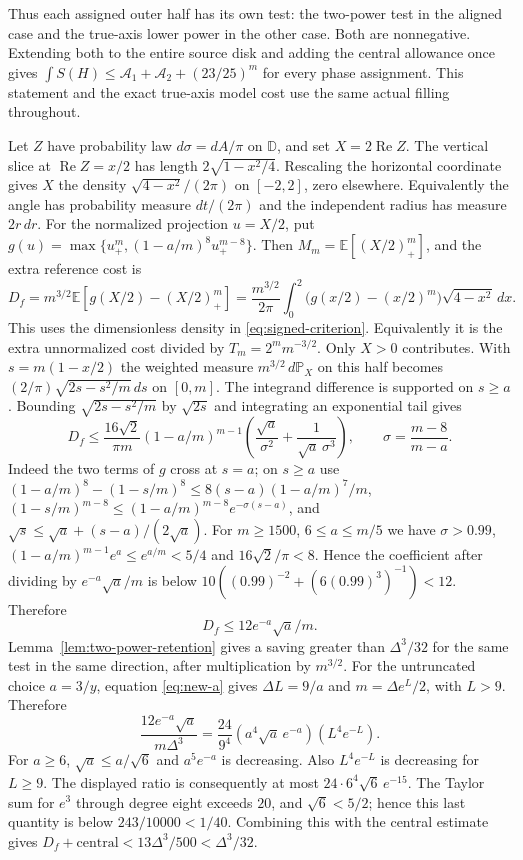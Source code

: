 \documentclass[11pt]{article}
\newcommand{\D}{\mathbb D}
\newcommand{\E}{\mathbb E}
\begin{document}
	Thus each assigned outer half has its own test: the two-power
	test in the aligned case and the true-axis lower power in the
	other case.  Both are nonnegative.  Extending both to the entire
	source disk and adding the central allowance once gives
	$\int S(H)\leq\mathcal A_1+\mathcal A_2+(23/25)^m$ for every
	phase assignment.  This statement and the exact true-axis model
	cost use the same actual filling throughout.
	
	Let $Z$ have probability law $d\sigma=dA/\pi$ on $\D$, and set
	$X=2\operatorname{Re}Z$. The vertical slice at $\operatorname{Re}Z=x/2$
	has length $2\sqrt{1-x^2/4}$. Rescaling the horizontal coordinate
	gives $X$ the density $\sqrt{4-x^2}/(2\pi)$ on $[-2,2]$, zero elsewhere.
	Equivalently the angle has probability measure $dt/(2\pi)$ and
	the independent radius has measure $2r\,dr$.
	For the normalized projection $u=X/2$, put
	$g(u)=\max\{u_+^m,(1-a/m)^8u_+^{m-8}\}$.
	Then $M_m=\E[(X/2)_+^m]$, and the extra reference cost is
	\begin{equation}\label{eq:semicircle-test}
		D_f=m^{3/2}\E[g(X/2)-(X/2)_+^m]
		=\frac{m^{3/2}}{2\pi}\int_0^2
		\bigl(g(x/2)-(x/2)^m\bigr)\sqrt{4-x^2}\,dx .
	\end{equation}
	This uses the dimensionless density in \eqref{eq:signed-criterion}.
	Equivalently it is the extra unnormalized cost divided by
	$T_m=2^m m^{-3/2}$. Only $X>0$ contributes.
	With $s=m(1-x/2)$ the weighted measure $m^{3/2}\,d\mathbb P_X$
	on this half becomes $(2/\pi)\sqrt{2s-s^2/m}\,ds$ on $[0,m]$.
	The integrand difference is supported on $s\geq a$. Bounding
	$\sqrt{2s-s^2/m}$ by $\sqrt{2s}$ and integrating an exponential tail gives
	\[
	D_f\leq\frac{16\sqrt2}{\pi m}(1-a/m)^{m-1}
	\left(\frac{\sqrt a}{\sigma^2}
	+\frac1{\sqrt a\,\sigma^3}\right),
	\qquad \sigma=\frac{m-8}{m-a}.
	\]
	Indeed the two terms of $g$ cross at $s=a$; on $s\geq a$ use
	$(1-a/m)^8-(1-s/m)^8\leq8(s-a)(1-a/m)^7/m$,
	$(1-s/m)^{m-8}\leq(1-a/m)^{m-8}e^{-\sigma(s-a)}$,
	and $\sqrt s\leq\sqrt a+(s-a)/(2\sqrt a)$.
	For $m\geq1500$, $6\leq a\leq m/5$ we have
	$\sigma>0.99$, $(1-a/m)^{m-1}e^a\leq e^{a/m}<5/4$ and
	$16\sqrt2/\pi<8$.  Hence the coefficient after dividing by
	$e^{-a}\sqrt a/m$ is below
	$10((0.99)^{-2}+(6(0.99)^3)^{-1})<12$.
	Therefore
	\begin{equation}\label{eq:model-error}
		D_f\leq12e^{-a}\sqrt a/m.
	\end{equation}
	Lemma~\ref{lem:two-power-retention} gives a saving greater than
	$\Delta^3/32$ for the same test in the same direction, after
	multiplication by $m^{3/2}$.
	For the untruncated choice $a=3/y$, equation \eqref{eq:new-a} gives
	$\Delta L=9/a$ and $m=\Delta e^L/2$, with $L>9$.  Therefore
	\[
	\frac{12e^{-a}\sqrt a}{m\Delta^3}
	=\frac{24}{9^4}
	(a^4\sqrt a\,e^{-a})(L^4e^{-L}).
	\]
	For $a\geq6$, $\sqrt a\leq a/\sqrt6$ and $a^5e^{-a}$ is
	decreasing.  Also $L^4e^{-L}$ is decreasing for $L\geq9$.
	The displayed ratio is consequently at most
	$24\cdot6^4\sqrt6\,e^{-15}$.  The Taylor sum for $e^3$
	through degree eight exceeds $20$, and $\sqrt6<5/2$; hence
	this last quantity is below $243/10000<1/40$.
	Combining this with the central estimate gives
	$D_f+\text{central}<13\Delta^3/500<\Delta^3/32$.
	
\end{document}
